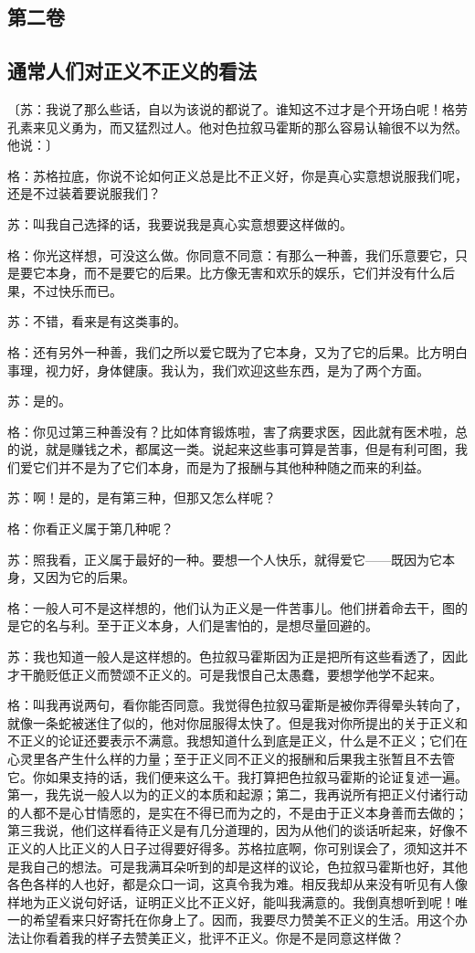 \documentclass[11pt,oneside]{book}
\begin{document}
\begin{common-format}
    

\chapter{第二卷}
\section{通常人们对正义不正义的看法}
〔苏：我说了那么些话，自以为该说的都说了。谁知这不过才是个开场白呢！格劳孔素来见义勇为，而又猛烈过人。他对色拉叙马霍斯的那么容易认输很不以为然。他说：〕

格：苏格拉底，你说不论如何正义总是比不正义好，你是真心实意想说服我们呢，还是不过装着要说服我们？

苏：叫我自己选择的话，我要说我是真心实意想要这样做的。

格：你光这样想，可没这么做。你同意不同意：有那么一种善，我们乐意要它，只是要它本身，而不是要它的后果。比方像无害和欢乐的娱乐，它们并没有什么后果，不过快乐而已。

苏：不错，看来是有这类事的。

格：还有另外一种善，我们之所以爱它既为了它本身，又为了它的后果。比方明白事理，视力好，身体健康。我认为，我们欢迎这些东西，是为了两个方面。

苏：是的。

格：你见过第三种善没有？比如体育锻炼啦，害了病要求医，因此就有医术啦，总的说，就是赚钱之术，都属这一类。说起来这些事可算是苦事，但是有利可图，我们爱它们并不是为了它们本身，而是为了报酬与其他种种随之而来的利益。

苏：啊！是的，是有第三种，但那又怎么样呢？

格：你看正义属于第几种呢？

苏：照我看，正义属于最好的一种。要想一个人快乐，就得爱它——既因为它本身，又因为它的后果。

格：一般人可不是这样想的，他们认为正义是一件苦事儿。他们拼着命去干，图的是它的名与利。至于正义本身，人们是害怕的，是想尽量回避的。

苏：我也知道一般人是这样想的。色拉叙马霍斯因为正是把所有这些看透了，因此才干脆贬低正义而赞颂不正义的。可是我恨自己太愚蠢，要想学他学不起来。

格：叫我再说两句，看你能否同意。我觉得色拉叙马霍斯是被你弄得晕头转向了，就像一条蛇被迷住了似的，他对你屈服得太快了。但是我对你所提出的关于正义和不正义的论证还要表示不满意。我想知道什么到底是正义，什么是不正义；它们在心灵里各产生什么样的力量；至于正义同不正义的报酬和后果我主张暂且不去管它。你如果支持的话，我们便来这么干。我打算把色拉叙马霍斯的论证复述一遍。第一，我先说一般人以为的正义的本质和起源；第二，我再说所有把正义付诸行动的人都不是心甘情愿的，是实在不得已而为之的，不是由于正义本身善而去做的；第三我说，他们这样看待正义是有几分道理的，因为从他们的谈话听起来，好像不正义的人比正义的人日子过得要好得多。苏格拉底啊，你可别误会了，须知这并不是我自己的想法。可是我满耳朵听到的却是这样的议论，色拉叙马霍斯也好，其他各色各样的人也好，都是众口一词，这真令我为难。相反我却从来没有听见有人像样地为正义说句好话，证明正义比不正义好，能叫我满意的。我倒真想听到呢！唯一的希望看来只好寄托在你身上了。因而，我要尽力赞美不正义的生活。用这个办法让你看着我的样子去赞美正义，批评不正义。你是不是同意这样做？


\end{common-format}
\end{document}
